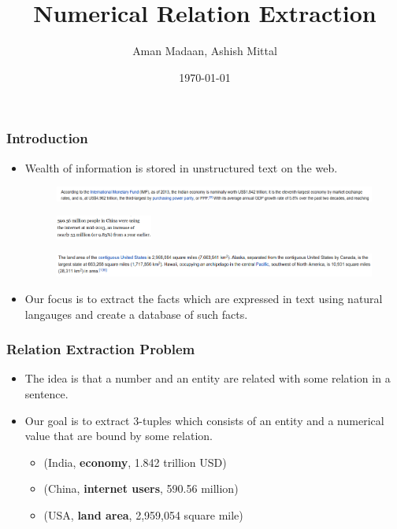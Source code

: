 \documentclass{beamer}
\begin{document}
\title{Numerical Relation Extraction}  
\author{Aman Madaan, Ashish Mittal}
\date{\today}

\begin{frame}
\frametitle{Introduction}

\begin{itemize}
 
 \item  Wealth of information is stored in unstructured text on the web.
 
  \begin{figure}
    \centering
    \includegraphics[width = 1.0\textwidth]{images/ex_1}
  \end{figure}
  
  \begin{figure}
    \centering
    \includegraphics[width = 0.3\textwidth]{images/ex_2}
  \end{figure}
  
    \begin{figure}
    \centering
    \includegraphics[width = 1.0\textwidth]{images/ex_3}
  \end{figure}
  

  \item Our focus is to extract the facts which are expressed in text using natural langauges and 
  create a database of such facts.
 
\end{itemize}

\end{frame}

\begin{frame}
 
 \frametitle{Relation Extraction Problem}
 
 \begin{itemize}
 \item The idea is that a number and an entity are related with some relation in a sentence.
 
 \item Our goal is to extract 3-tuples which consists of an entity and a numerical value that are bound by some relation.
  
    \begin{itemize}
	\item  (India, \textbf{economy}, 1.842 trillion USD)
	\item  (China, \textbf{internet users},  590.56 million)
	\item  (USA, \textbf{land area}, 2,959,054 square mile)
    \end{itemize}

 \end{itemize}

\end{frame}
\end{document}
